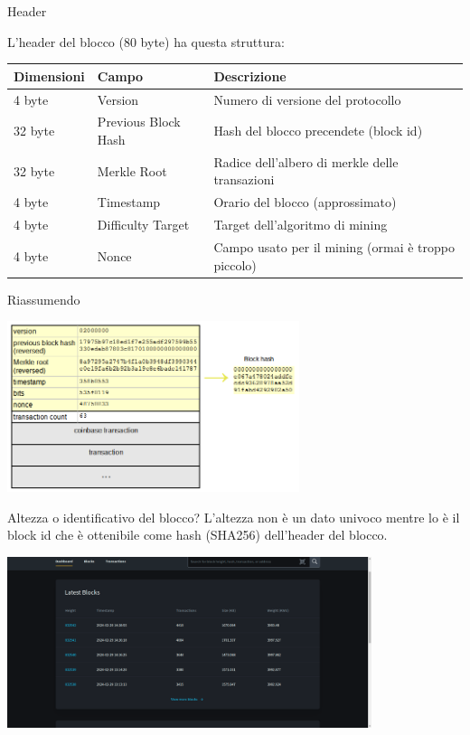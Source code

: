 \documentclass[aspectratio=169]{beamer}
\begin{document}
\begin{frame}{Header}
    \begin{center}
        L'header del blocco (80 byte) ha questa struttura:
        \begin{tabular}{|l|l|l|}
            \hline
                Dimensioni & Campo & Descrizione \\ 
            \hline
                4 byte & Version & Numero di versione del protocollo\\ 
            \hline
                32 byte & Previous Block Hash & Hash del blocco precendete (block id)\\ 
            \hline
                32 byte & Merkle Root & Radice dell'albero di merkle delle transazioni\\ 
            \hline
                4 byte & Timestamp & Orario del blocco (approssimato)\\ 
            \hline
                4 byte & Difficulty Target & Target dell'algoritmo di mining\\ 
            \hline
                4 byte & Nonce & Campo usato per il mining (ormai è troppo piccolo)\\ 
            \hline
        \end{tabular}
    \end{center}
\end{frame}

\begin{frame}{Riassumendo}
    \begin{center}
        \includegraphics[height=5cm]{blocco_struct.png}
    \end{center}
\end{frame}

\begin{frame}{Altezza o identificativo del blocco?}
    L'altezza non è un dato univoco mentre lo è il block id che è ottenibile come hash (SHA256) dell'header del blocco.
    \begin{center}
        \includegraphics[height=5cm]{altezza.png}
    \end{center}
\end{frame}
\end{document}

